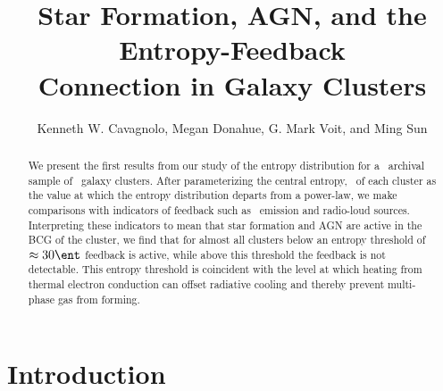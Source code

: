 \documentclass{emulateapj}
\begin{document}
\title{Star Formation, AGN, and the Entropy-Feedback\\
  Connection in Galaxy Clusters}
\author{
  Kenneth W. Cavagnolo,
  Megan Donahue,
  G. Mark Voit, 
  and Ming Sun}


\begin{abstract}
  We present the first results from our study of the entropy
  distribution for a \Chandra\ archival sample of \clnum\ galaxy
  clusters. After parameterizing the central entropy, \kna\, of each
  cluster as the value at which the entropy distribution departs from
  a power-law, we make comparisons with indicators of feedback such as
  \halpha\ emission and radio-loud sources. Interpreting these
  indicators to mean that star formation and AGN are active in the BCG
  of the cluster, we find that for almost all clusters below an
  entropy threshold of $\approx 30 \ent$ feedback is active, while
  above this threshold the feedback is not detectable. This entropy
  threshold is coincident with the level at which heating from thermal
  electron conduction can offset radiative cooling and thereby prevent
  multi-phase gas from forming.
\end{abstract}


\section{Introduction}
\label{sec:intro}
\end{document}
